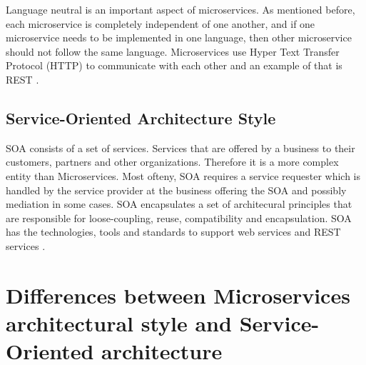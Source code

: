 \documentclass{IEEEtran}
\begin{document}
			Language neutral is an important aspect of microservices. As mentioned before, each microservice is completely independent of one another, and if one microservice needs to be implemented in one language, then other microservice should not follow the same language. Microservices use Hyper Text Transfer Protocol (HTTP) to communicate with each other and an example of that is REST \cite{ibmred}.

		\subsection{Service-Oriented Architecture Style}
			SOA consists of a set of services. Services that are offered by a business to their customers, partners and other organizations. Therefore it is a more complex entity than Microservices. Most ofteny, SOA requires a service requester which is handled by the service provider at the business offering the SOA and possibly mediation in some cases. SOA encapsulates a set of architecural principles that are responsible for loose-coupling, reuse, compatibility and encapsulation. SOA has the technologies, tools and standards to support web services and REST services \cite{ibmred}.


	\section{Differences between Microservices architectural style and Service-Oriented architecture}




	\newpage
	
	
\end{document}
